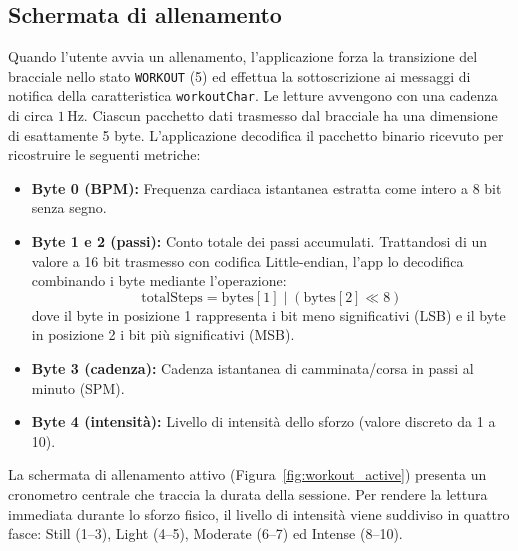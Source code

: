 \subsection{Schermata di allenamento}
Quando l'utente avvia un allenamento, l'applicazione forza la transizione del bracciale nello stato \texttt{WORKOUT} (5) ed effettua la sottoscrizione ai messaggi di notifica della caratteristica \texttt{workoutChar}. Le letture avvengono con una cadenza di circa $1\,\text{Hz}$. Ciascun pacchetto dati trasmesso dal bracciale ha una dimensione di esattamente 5 byte. L'applicazione decodifica il pacchetto binario ricevuto per ricostruire le seguenti metriche:
\begin{itemize}
    \item \textbf{Byte 0 (BPM):} Frequenza cardiaca istantanea estratta come intero a 8 bit senza segno.
    \item \textbf{Byte 1 e 2 (passi):} Conto totale dei passi accumulati. Trattandosi di un valore a 16 bit trasmesso con codifica Little-endian, l'app lo decodifica combinando i byte mediante l'operazione:
    \begin{equation}
        \text{totalSteps} = \text{bytes}[1] \mid (\text{bytes}[2] \ll 8)
    \end{equation}
    dove il byte in posizione 1 rappresenta i bit meno significativi (LSB) e il byte in posizione 2 i bit più significativi (MSB).
    \item \textbf{Byte 3 (cadenza):} Cadenza istantanea di camminata/corsa in passi al minuto (SPM).
    \item \textbf{Byte 4 (intensità):} Livello di intensità dello sforzo (valore discreto da 1 a 10).
\end{itemize}
La schermata di allenamento attivo (Figura~\ref{fig:workout_active}) presenta un cronometro centrale che traccia la durata della sessione. Per rendere la lettura immediata durante lo sforzo fisico, il livello di intensità viene suddiviso in quattro fasce: Still (1--3), Light (4--5), Moderate (6--7) ed Intense (8--10).


